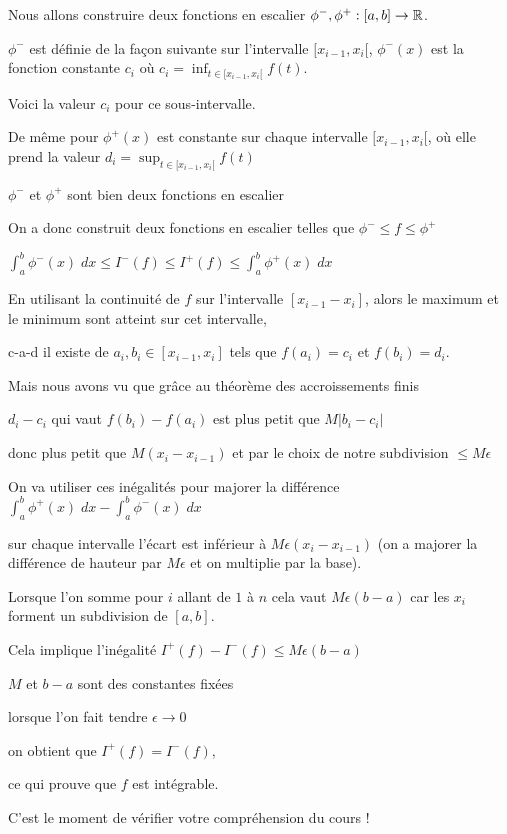 \change


Nous allons construire deux fonctions
en escalier $\phi^-, \phi^+ : [a,b] \to \mathbb{R}$.

$\phi^-$ est définie de la façon suivante 
sur l'intervalle $[x_{i-1},x_i[$,
$\phi^-(x)$ est la fonction constante $c_i$ 
où $c_i=\inf_{t\in [x_{i-1},x_i[} f(t)$.

\change

Voici la valeur $c_i$ pour ce sous-intervalle.

\change


De même pour $\phi^+(x)$ est constante sur chaque intervalle $[x_{i-1},x_i[$,
où elle prend la valeur $d_i = \sup_{t\in [x_{i-1},x_i[} f(t)$


$\phi^-$ et $\phi^+$ sont bien deux fonctions en escalier


\diapo


On a donc construit deux fonctions en escalier telles que $\phi^-\le f \le \phi^+$


\change

$\int_a^b \phi^-(x)\;dx \le I^-(f) \le I^+(f) \le \int_a^b \phi^+(x)\;dx$

\change

En utilisant la continuité de $f$ sur l'intervalle $[x_{i - 1} - x_i]$, 
alors le maximum et le minimum sont atteint sur cet intervalle,

c-a-d il existe
de $a_i,b_i \in [x_{i -1},x_i]$ tels que $f(a_i)=c_i$ et $f(b_i)=d_i$.

\change

Mais nous avons vu que grâce au théorème des accroissements finis 

$d_i-c_i$ qui vaut $ f(b_i) - f(a_i)$ est plus petit que $M |b_i - c_i|$

donc plus petit que $M (x_i-x_{i-1})$ et par le choix de notre subdivision $ \le M\epsilon$ 

\change

On va utiliser ces inégalités pour majorer la différence 
$\int_a^b \phi^+(x)\;dx - \int_a^b \phi^-(x)\;dx$

sur chaque intervalle  l'écart est inférieur à $M\epsilon(x_i-x_{i-1})$ 
(on a majorer la différence de hauteur par $M\epsilon$ et on multiplie par la base).

Lorsque l'on somme pour $i$ allant de $1$ à $n$ cela vaut 
$M\epsilon(b-a)$
car les $x_i$ forment un subdivision de $[a,b]$.

\change

Cela implique l'inégalité $I^+(f) - I^-(f) \le M\epsilon(b-a)$ 


\change

$M$ et $b-a$ sont des constantes fixées

lorsque l'on fait tendre $\epsilon \to 0$

on obtient que $I^+(f) = I^-(f)$, 

\change

ce qui prouve que $f$ est intégrable.

\diapo

C'est le moment de vérifier votre compréhension du cours !


